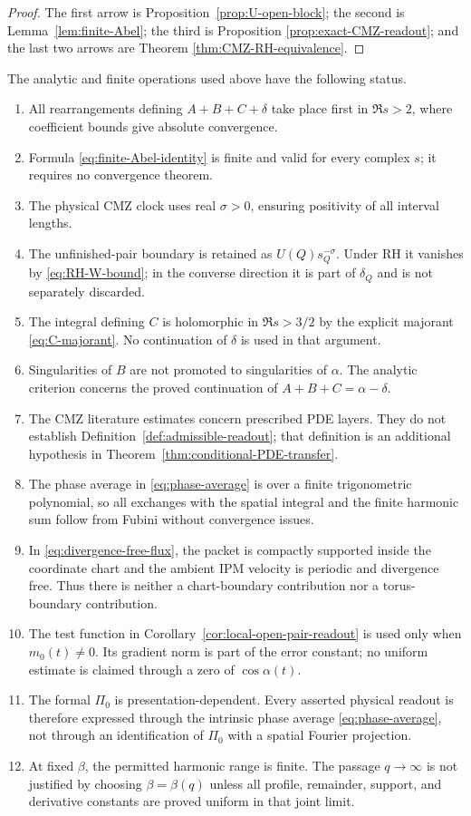 \documentclass[11pt]{amsart}
\numberwithin{equation}{section}
\theoremstyle{plain}
\theoremstyle{definition}
\theoremstyle{remark}
\begin{document}
\begin{proof}
The first arrow is Proposition~\ref{prop:U-open-block}; the second is
Lemma~\ref{lem:finite-Abel}; the third is Proposition
\ref{prop:exact-CMZ-readout}; and the last two arrows are Theorem
\ref{thm:CMZ-RH-equivalence}.
\end{proof}

The analytic and finite operations used above have the following status.
\begin{enumerate}[label=\textup{A\arabic*.},leftmargin=*]
\item All rearrangements defining $A+B+C+\delta$ take place first in
$\Re s>2$, where coefficient bounds give absolute convergence.
\item Formula \eqref{eq:finite-Abel-identity} is finite and valid for every
complex $s$; it requires no convergence theorem.
\item The physical CMZ clock uses real $\sigma>0$, ensuring positivity of all
interval lengths.
\item The unfinished-pair boundary is retained as $U(Q)s_Q^{-\sigma}$.
Under RH it vanishes by \eqref{eq:RH-W-bound}; in the converse direction it is
part of $\delta_Q$ and is not separately discarded.
\item The integral defining $C$ is holomorphic in $\Re s>3/2$ by the explicit
majorant \eqref{eq:C-majorant}.  No continuation of $\delta$ is used in that
argument.
\item Singularities of $B$ are not promoted to singularities of $\alpha$.
The analytic criterion concerns the proved continuation of
$A+B+C=\alpha-\delta$.
\item The CMZ literature estimates concern prescribed PDE layers.  They do not
establish Definition~\ref{def:admissible-readout}; that definition is an
additional hypothesis in Theorem~\ref{thm:conditional-PDE-transfer}.
\item The phase average in \eqref{eq:phase-average} is over a finite
trigonometric polynomial, so all exchanges with the spatial integral and the
finite harmonic sum follow from Fubini without convergence issues.
\item In \eqref{eq:divergence-free-flux}, the packet is compactly supported
inside the coordinate chart and the ambient IPM velocity is periodic and
divergence free.  Thus there is neither a chart-boundary contribution nor a
torus-boundary contribution.
\item The test function in Corollary~\ref{cor:local-open-pair-readout} is used
only when $m_0(t)\ne0$.  Its gradient norm is part of the error constant; no
uniform estimate is claimed through a zero of $\cos\alpha(t)$.
\item The formal $\Pi_0$ is presentation-dependent.  Every asserted physical
readout is therefore expressed through the intrinsic phase average
\eqref{eq:phase-average}, not through an identification of $\Pi_0$ with a
spatial Fourier projection.
\item At fixed $\beta$, the permitted harmonic range is finite.  The passage
$q\to\infty$ is not justified by choosing $\beta=\beta(q)$ unless all profile,
remainder, support, and derivative constants are proved uniform in that
joint limit.
\end{enumerate}
\end{document}
